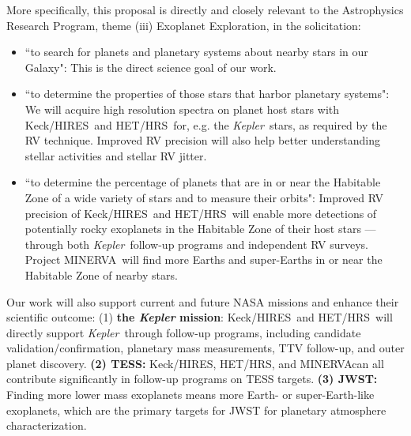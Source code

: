 \documentclass[12pt]{article}
\def\kepler{{\it Kepler}}
\def\minerva{MINERVA}
\def\hrs{HET/HRS}
\def\keck{Keck/HIRES}
\begin{document}
More specifically, this proposal is directly and closely relevant to
the Astrophysics Research Program, theme (iii) Exoplanet Exploration,
in the solicitation:
\begin{itemize}[leftmargin=1.5em]
  \vspace{-3pt}
\item ``to search for planets and planetary systems about
  nearby stars in our Galaxy": This is the direct science goal of our
  work. 
  \vspace{-3pt}
\item ``to determine the properties of those stars that harbor
  planetary systems": We will acquire high resolution spectra on
  planet host stars with \keck\ and \hrs\ for, e.g. the
  \kepler\ stars, as required by the RV technique. Improved RV
  precision will also help better understanding stellar activities and
  stellar RV jitter.
  \vspace{-3pt}
\item ``to determine the percentage of planets that are in or near the
  Habitable Zone of a wide variety of stars and to measure their
  orbits": Improved RV precision of \keck\ and \hrs\ will enable more
  detections of potentially rocky exoplanets in the Habitable Zone of
  their host stars --- through both \kepler\ follow-up programs and
  independent RV surveys. Project \minerva\ will find more Earths and
  super-Earths in or near the Habitable Zone of nearby stars.
  \vspace{-3pt}
\end{itemize}

Our work will also support current and future NASA missions and
enhance their scientific outcome: (1) {\bf the \textit{Kepler}
  mission}: \keck\ and \hrs\ will directly support \kepler\ through
follow-up programs, including candidate validation/confirmation,
planetary mass measurements, TTV follow-up, and outer planet
discovery. {\bf (2) TESS:} \keck, \hrs, and \minerva can all
contribute significantly in follow-up programs on TESS targets. {\bf
  (3) JWST:} Finding more lower mass exoplanets means more Earth- or
super-Earth-like exoplanets, which are the primary targets for JWST
for planetary atmosphere characterization.



\vspace{-3pt}
{\small %
 }
\end{document}
